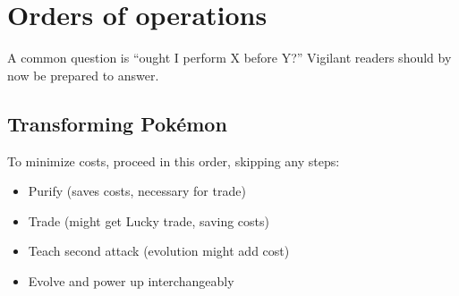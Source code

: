 \chapter{Orders of operations}
\label{chap:ooo}
A common question is ``ought I perform X before Y?''
Vigilant readers should by now be prepared to answer.

\section{Transforming Pokémon}
\label{sec:pokemontransforms}
To minimize costs, proceed in this order, skipping any steps:
\begin{itemize}
\item Purify (saves costs, necessary for trade)
\item Trade (might get Lucky trade, saving costs)
\item Teach second attack (evolution might add cost)
\item Evolve and power up interchangeably
\end{itemize}

